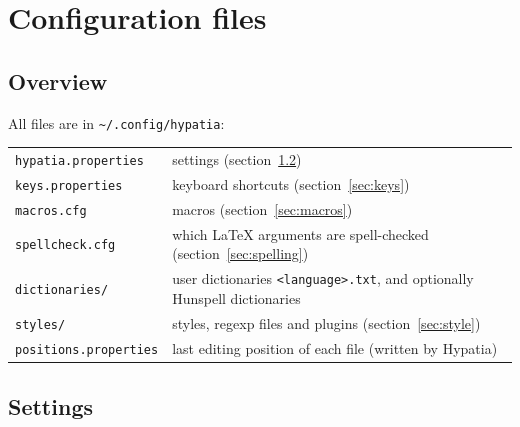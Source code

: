 \documentclass[11pt]{article}
\newcommand{\file}[1]{\texttt{#1}}
\newcommand{\cfgdir}{\texttt{\textasciitilde/.config/hypatia}}
\begin{document}
    \section{Configuration files}\label{sec:files}

    \subsection{Overview}

    All files are in \cfgdir:\\[2mm]
    \hspace*{1cm}\begin{tabular}{ll}
        \file{hypatia.properties} & settings (section~\ref{sec:settings})\\
        \file{keys.properties} & keyboard shortcuts (section~\ref{sec:keys})\\
        \file{macros.cfg} & macros (section~\ref{sec:macros})\\
        \file{spellcheck.cfg} & which LaTeX arguments are spell-checked (section~\ref{sec:spelling})\\
        \file{dictionaries/} & user dictionaries \verb+<language>.txt+, and optionally Hunspell dictionaries\\
        \file{styles/} & styles, regexp files and plugins (section~\ref{sec:style})\\
        \file{positions.properties} & last editing position of each file (written by Hypatia)
    \end{tabular}

    \subsection{Settings}\label{sec:settings}
\end{document}
